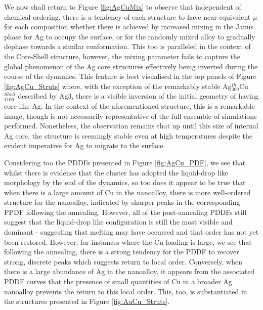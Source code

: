 We now shall return to Figure \ref{fig:AgCuMix} to observe that independent of chemical ordering, there is a tendency of each structure to have near equivalent $\mu$ for each composition whether there is achieved by increased mixing in the Janus phase for Ag to occupy the surface, or for the randomly mixed alloy to gradually dephase towards a similar conformation. This too is paralleled in the context of the Core-Shell structure, however, the mixing parameter fails to capture the global phenomenon of the Ag core structures effectively being inverted during the course of the dynamics. This feature is best visualised in the top panels of Figure \ref{fig:AgCu_Struts} where, with the exception of the remarkably stable Ag$_{309}^{Ih}$Cu$_{1106}^{Shell}$ described by Ag3, there is a visible inversion of the initial geometry of having core-like Ag. In the context of the aforementioned structure, this is a remarkable image, though is not necessarily representative of the full ensemble of simulations performed. Nonetheless, the observation remains that up until this size of internal Ag core, the structure is seemingly stable even at high temperatures despite the evident imperative for Ag to migrate to the surface.

Considering too the PDDFs presented in Figure \ref{fig:AgCu_PDF}, we see that whilst there is evidence that the cluster has adopted the liquid-drop like morphology by the end of the dynamics, so too does it appear to be true that when there is a large amount of Cu in the nanoalloy, there is more well-ordered structure for the nanoalloy, indicated by sharper peaks in the corresponding PPDF following the annealing. However, all of the post-annealing PDDFs still suggest that the liquid-drop like configuration is still the most visible and dominant - suggesting that melting may have occurred and that order has not yet been restored. However, for instances where the Cu loading is large, we see that following the annealing, there is a strong tendency for the PDDF to recover strong, discrete peaks which suggests return to local order. Conversely, when there is a large abundance of Ag in the nanoalloy, it appears from the associated PDDF curves that the presence of small quantities of Cu in a broader Ag nanoalloy prevents the return to this local order. This, too, is substantiated in the structures presented in Figure \ref{fig:AuCu_Struts}.



